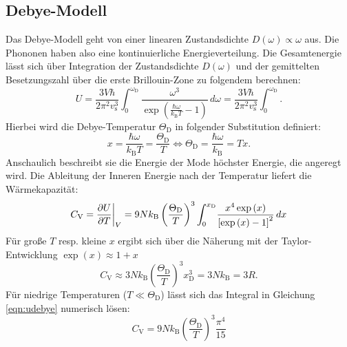 \subsection{Debye-Modell}
Das Debye-Modell geht von einer linearen Zustandsdichte $D(\omega) \propto \omega$ aus.
Die Phononen haben also eine kontinuierliche Energieverteilung.
Die Gesamtenergie lässt sich über Integration der Zustandsdichte $D(\omega)$ und der gemittelten Besetzungszahl über die erste Brillouin-Zone zu folgendem berechnen:
\begin{equation}
	U = \frac{3 V \hbar}{2 \pi^2 v_{\text{s}}^3} \int_{0}^{\omega_{\text{D}}} \! \frac{ \omega^3 }{ \exp{ \left(  \frac{\hbar \omega}{k_{\text{B}} T} - 1  \right)} } \, d\omega
	= \frac{3 V \hbar}{2 \pi^2 v_{\text{s}}^3} \int_{0}^{\omega_{\text{D}}} .
	\label{eqn:udebye}
\end{equation}
Hierbei wird die Debye-Temperatur $\Theta_{\text{D}}$ in folgender Substitution definiert:
\begin{equation*}
	x = \frac{\hbar \omega}{k_{\text{B}} T} = \frac{\Theta_{\text{D}}}{T} \Leftrightarrow  \Theta_{\text{D}} = \frac{\hbar \omega}{k_{\text{B}}} = T x.
\end{equation*}
Anschaulich beschreibt sie die Energie der Mode höchster Energie, die angeregt wird.
Die Ableitung der Inneren Energie nach der Temperatur liefert die Wärmekapazität:
\begin{equation*}
	C_{\text{V}} = \frac{\partial U}{\partial T} \bigg{\vert}_{V} = 9 N k_{\text{B}} \left( \frac{\Theta_{\text{D}}}{T} \right)^3 \int_{0}^{x_{\text{D}}} \! \frac{ x^4 \exp{(x)}}{ \left[ \exp{ (x) } - 1  \right]^2}  \, dx
\end{equation*}
Für große $T$ resp. kleine $x$ ergibt sich über die Näherung mit der Taylor-Entwicklung $\exp(x) \approx 1 + x $
\begin{equation*}
	C_{\text{V}} \approx 3 N k_{\text{B}} \left( \frac{\Theta_{\text{D}}}{T} \right)^3 x_{\text{D}}^3= 3 N k_{\text{B}} = 3 R.
\end{equation*}
Für niedrige Temperaturen ($T \ll \Theta_{\text{D}}$) lässt sich das Integral in Gleichung \eqref{eqn:udebye} numerisch lösen:
\begin{equation*}
	C_{\text{V}} = 9 N k_{\text{B}} \left( \frac{\Theta_{\text{D}}}{T} \right)^3 \frac{\pi^4}{15}
\end{equation*}
\FloatBarrier
